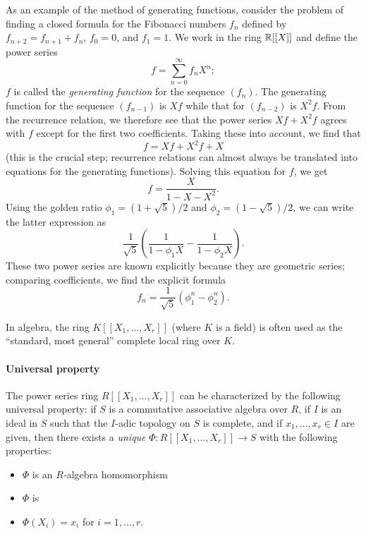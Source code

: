 \documentclass[12pt]{article}
\begin{document}
As an example of the method of generating functions, consider the
problem of finding a closed formula for the Fibonacci numbers $f_n$
defined by $f_{n+2}=f_{n+1}+f_n$, $f_0=0$, and $f_1=1$. We work in the
ring $\Bbb{R}[[X]]$ and define the power series
$$ f=\sum_{n=0}^\infty f_n X^n;$$
$f$ is called the \emph{generating function} for the sequence $(f_n)$.
The generating function for the sequence $(f_{n-1})$ is $Xf$ while
that for $(f_{n-2})$ is $X^2f$. From the recurrence relation, we
therefore see that the power series $Xf + X^2f$ agrees with $f$ except
for the first two coefficients. Taking these into account, we find
that
$$f=Xf+X^2f+X$$
(this is the crucial step; recurrence relations can almost always be
translated into equations for the generating functions). Solving this
equation for $f$, we get
$$f=\frac{X}{1-X-X^2}.$$
Using the golden ratio $\phi_1=(1+\sqrt{5})/2$ and
$\phi_2=(1-\sqrt{5})/2$, we can write the latter expression as
$$\frac{1}{\sqrt{5}}\left(\frac{1}{1-\phi_1X}-\frac{1}{1-\phi_2X}\right).$$
These two power series are known explicitly because they are geometric
series; comparing coefficients, we find the explicit formula
$$f_n = \frac{1}{\sqrt{5}}\left(\phi_1^n-\phi_2^n\right).$$

In algebra, the ring $K[[X_1,\ldots,X_r]]$ (where $K$ is a field) is often
used as the ``standard, most general'' complete local ring over $K$.

\paragraph{Universal property}

The power series ring $R[[X_1,\ldots,X_r]]$ can be characterized by the
following universal property: if $S$ is a commutative associative
algebra over $R$, if $I$ is an ideal in $S$ such that the $I$-adic
topology on $S$ is complete, and if $x_1,\ldots,x_r\in I$ are given, then
there exists a \emph{unique} $\Phi : R[[X_1,\ldots,X_r]] \to S$ with the
following properties:
\begin{itemize}
\item $\Phi$ is an $R$-algebra homomorphism
\item $\Phi$ is 
\item $\Phi(X_i)=x_i$ for $i=1,\ldots,r$.
\end{itemize}
\end{document}
